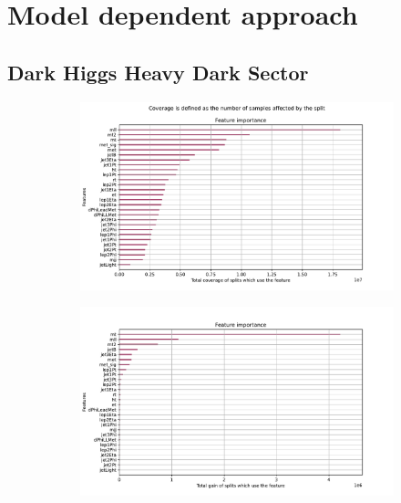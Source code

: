 \documentclass[12pt, a4paper]{book}
\begin{document}
\chapter{Model dependent approach}\label{apx:MDA}
\graphicspath{{../../Plots/}}

\section{Dark Higgs Heavy Dark Sector}
\begin{figure}[!ht]
	\centering
	\begin{subfigure}[b]{0.7\textwidth}
      \centering
      \includegraphics[width=1\textwidth]{XGBoost/DH_HDS/feature_importance/total_cover.pdf}
      \end{subfigure}
      \hfill
      \begin{subfigure}[b]{0.7\textwidth}
         \centering
         \includegraphics[width=1\textwidth]{XGBoost/DH_HDS/feature_importance/total_gain.pdf}
      \end{subfigure}
      \hfill

\end{figure}
\end{document}
